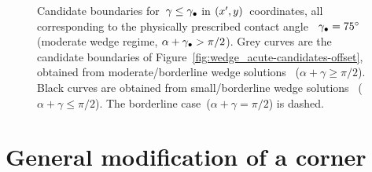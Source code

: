 \begin{figure}
  \newcommand*{\subfigurewidth}{0.31\textwidth}
  \begin{subfigure}[t]{\subfigurewidth}
  \end{subfigure}
  \hfill
  \begin{subfigure}[t]{\subfigurewidth}
  \end{subfigure}
  \hfill
  \begin{subfigure}[t]{\subfigurewidth}
  \end{subfigure}
  \caption{
    Candidate boundaries for~$\gamma \le \gamma_\bullet$
    in $(x', y)$~coordinates,
    all corresponding to the physically prescribed contact angle~%
    $\gamma_\bullet = \SI{75}{\degree}$
    (moderate wedge regime, $\alpha + \gamma_\bullet > \pi/2$).
    Grey curves are the candidate boundaries of
    Figure~\ref{fig:wedge_acute-candidates-offset},
    obtained from moderate/borderline wedge solutions~%
      ($\alpha + \gamma \ge \pi/2$).
    Black curves are obtained from small/borderline wedge solutions~%
      ($\alpha + \gamma \le \pi/2$).
    The borderline case~($\alpha + \gamma = \pi/2$) is dashed.
  }
  \label{fig:wedge_small-moderate-candidates-offset}
\end{figure}

\section{General modification of a corner}
\label{sec:small.modification}

